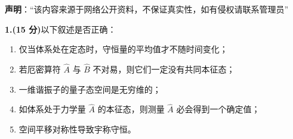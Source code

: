 
\textbf{声明}：“该内容来源于网络公开资料，不保证真实性，如有侵权请联系管理员”

\textbf{1.(15 分)}以下叙述是否正确：

\begin{enumerate}
    \item  仅当体系处在定态时，守恒量的平均值才不随时间变化；
    \item  若厄密算符 $\hat{A}$ 与 $\hat{B}$ 不对易，则它们一定没有共同本征态；
    \item  一维谐振子的量子态空间是无穷维的；
    \item  如体系处于力学量 $\hat{A}$ 的本征态，则测量 $\hat{A}$ 必会得到一个确定值；
    \item  空间平移对称性导致宇称守恒。
\end{enumerate}